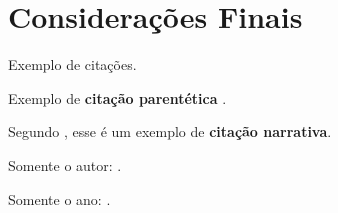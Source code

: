 \section{Considerações Finais}\label{sec:finais}

Exemplo de citações.

Exemplo de \textbf{citação parentética} \cite{Teste2025}.

Segundo , esse é um exemplo de \textbf{citação narrativa}.

Somente o autor: \citeauthor{Teste2025}.

Somente o ano: \citeyear{Teste2025}.
